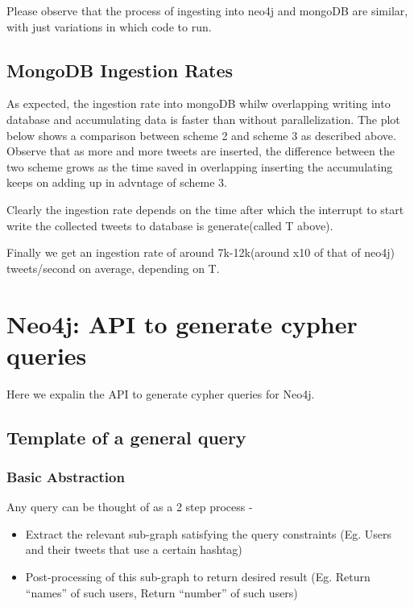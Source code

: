 \documentclass[letterpaper,10pt,english]{sphinxmanual}
\begin{document}
Please observe that the process of ingesting into neo4j and mongoDB are similar, with just variations in which code to run.


\section{MongoDB Ingestion Rates}
\label{\detokenize{mongoDB_data_ingestion:mongodb-ingestion-rates}}
As expected, the ingestion rate into mongoDB whilw overlapping writing into database and accumulating data is faster than without parallelization. The plot below shows a comparison between scheme 2 and scheme 3 as described above. Observe that as more and more tweets are inserted, the difference between the two scheme grows as the time saved in overlapping inserting the accumulating keeps on adding up in advntage of scheme 3.

\noindent{}

Clearly the ingestion rate depends on the time after which the interrupt to start write the collected tweets to database is generate(called T above).

Finally we get an ingestion rate of around 7k-12k(around x10 of that of neo4j) tweets/second on average, depending on T.


\chapter{Neo4j: API to generate cypher queries}
\label{\detokenize{neo4j_query_generation:neo4j-api-to-generate-cypher-queries}}\label{\detokenize{neo4j_query_generation::doc}}
Here we expalin the API to generate cypher queries for Neo4j.


\section{Template of a general query}
\label{\detokenize{neo4j_query_generation:template-of-a-general-query}}

\subsection{Basic Abstraction}
\label{\detokenize{neo4j_query_generation:basic-abstraction}}
Any query can be thought of as a 2 step process -
\begin{itemize}
\item {} 
Extract the relevant sub-graph satisfying the query constraints (Eg. Users and their tweets that use a certain hashtag)

\item {} 
Post-processing of this sub-graph to return desired result (Eg. Return “names” of such users, Return “number” of such users)

\end{itemize}
\end{document}
